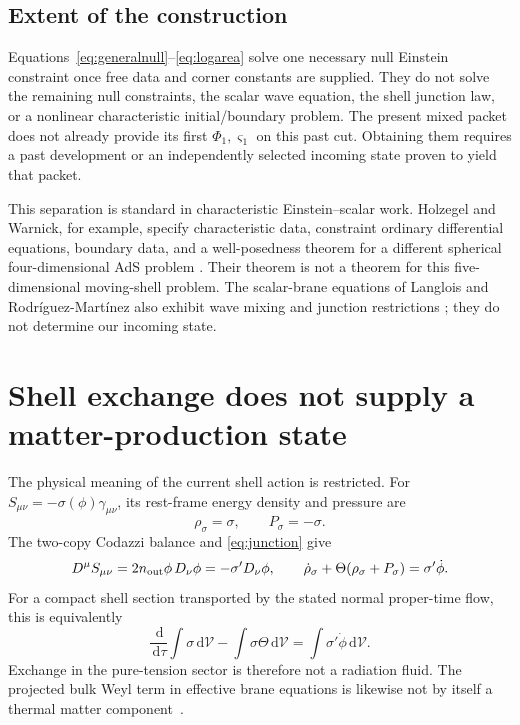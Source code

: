 \documentclass[11pt]{article}
\newcommand{\dd}{\,\mathrm d}
\newcommand{\calV}{\mathcal V}
\begin{document}
\subsection{Extent of the construction}
Equations~\eqref{eq:generalnull}--\eqref{eq:logarea} solve one necessary
null Einstein constraint once free data and corner constants are supplied.
They do not solve the remaining null constraints, the scalar wave equation,
the shell junction law, or a nonlinear characteristic initial/boundary
problem. The present mixed packet does not already provide its first
$\Phi_1,\varsigma_1$ on this past cut. Obtaining them requires a past
development or an independently selected incoming state proven to yield
that packet.

This separation is standard in characteristic Einstein--scalar work.
Holzegel and Warnick, for example, specify characteristic data, constraint
ordinary differential equations, boundary data, and a well-posedness
theorem for a different spherical four-dimensional AdS problem
\cite{hw}. Their theorem is not a theorem for this five-dimensional
moving-shell problem. The scalar-brane equations of Langlois and
Rodr\'iguez-Mart\'inez also exhibit wave mixing and junction restrictions
\cite{lrm}; they do not determine our incoming state.

\section{Shell exchange does not supply a matter-production state}
\label{sec:matter}
The physical meaning of the current shell action is restricted.
For $S_{\mu\nu}=-\sigma(\phi)\gamma_{\mu\nu}$, its rest-frame energy
density and pressure are
\begin{equation}
 \rho_\sigma=\sigma,\qquad P_\sigma=-\sigma.
\end{equation}
The two-copy Codazzi balance and \eqref{eq:junction} give
\begin{equation}
 D^\mu S_{\mu\nu}=2n_{\rm out}\phi\,D_\nu\phi
     =-\sigma'D_\nu\phi,\qquad
 \dot\rho_\sigma+\Theta(\rho_\sigma+P_\sigma)=\sigma'\dot\phi.
 \label{eq:codazzi}
\end{equation}
For a compact shell section transported by the stated normal proper-time
flow, this is equivalently
\begin{equation}
 \frac{\dd}{\dd\tau}\int\sigma\dd\calV
       -\int\sigma\Theta\dd\calV
       =\int\sigma'\dot\phi\dd\calV.
\end{equation}
Exchange in the pure-tension sector is therefore not a radiation fluid.
The projected bulk Weyl term in effective brane equations is likewise
not by itself a thermal matter component~\cite{sms}.
\end{document}

